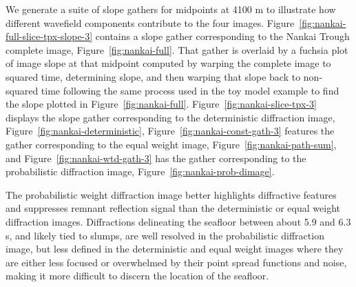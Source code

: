 

We generate a suite of slope gathers for midpoints at 4100 m to illustrate how different wavefield components contribute to the four images.  Figure~\ref{fig:nankai-full-slice-tpx-slope-3} contains a slope gather corresponding to the Nankai Trough complete image, Figure~\ref{fig:nankai-full}.  That gather is overlaid by a fuchsia plot of image slope at that midpoint computed by warping the complete image to squared time, determining slope, and then warping that slope back to non-squared time following the same process used in the toy model example to find the slope plotted in Figure~\ref{fig:nankai-full}.  Figure~\ref{fig:nankai-slice-tpx-3} displays the slope gather corresponding to the deterministic diffraction image, Figure~\ref{fig:nankai-deterministic}, Figure~\ref{fig:nankai-const-gath-3} features the gather corresponding to the equal weight image, Figure~\ref{fig:nankai-path-sum}, and Figure~\ref{fig:nankai-wtd-gath-3} has the gather corresponding to the probabilistic diffraction image, Figure~\ref{fig:nankai-prob-dimage}.


The probabilistic weight diffraction image better highlights diffractive features and suppresses remnant reflection signal than the deterministic or equal weight diffraction images.  Diffractions delineating the seafloor between about 5.9 and 6.3 s, and likely tied to slumps, are well resolved in the probabilistic diffraction image, but less defined in the deterministic and equal weight images where they are either less focused or overwhelmed by their point spread functions and noise, making it more difficult to discern the location of the seafloor.  

